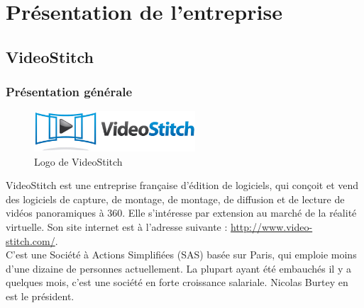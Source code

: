 \chapter{Présentation de l'entreprise}

\section{VideoStitch}
\subsection{Présentation générale}
\begin{figure}
  \centering
  \includegraphics[width=6cm]{images/videostitch.jpg}
  \caption{Logo de VideoStitch}
\end{figure}
VideoStitch est une entreprise française d'édition de logiciels, qui conçoit et 
vend des logiciels de capture, de montage, de montage, de diffusion et de lecture 
de vidéos panoramiques à 360\degree. Elle s'intéresse par extension au marché de 
la réalité virtuelle.
Son site internet est à l'adresse suivante : \url{http://www.video-stitch.com/}.\\
C'est une Société à Actions Simplifiées (SAS) basée sur Paris, qui emploie moins
d'une dizaine de personnes actuellement. La plupart ayant été embauchés il y a 
quelques mois, c'est une société en forte croissance salariale. 
Nicolas Burtey en est le président.

